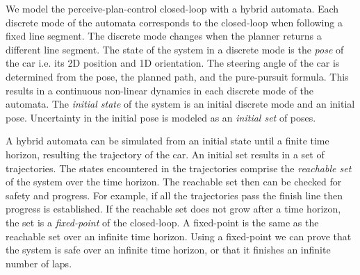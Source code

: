 We model the perceive-plan-control closed-loop with a hybrid automata.
%
Each discrete mode of the automata corresponds to the closed-loop when following a fixed line segment.
%
The discrete mode changes when the planner returns a different line segment.
%
The state of the system in a discrete mode is the \emph{pose} of the car i.e. its 2D position and 1D orientation.
%
The steering angle of the car is determined from the pose, the planned path, and the pure-pursuit formula.
%
This results in a continuous non-linear dynamics in each discrete mode of the automata.
%
The \emph{initial state} of the system is an initial discrete mode and an initial pose.
%
Uncertainty in the initial pose is modeled as an \emph{initial set} of poses.


A hybrid automata can be simulated from an initial state until a finite time horizon, resulting the trajectory of the car.
%
An initial set results in a set of trajectories.
%
The states encountered in the trajectories comprise the \emph{reachable set} of the system over the time horizon.
%
The reachable set then can be checked for safety and progress.
%
For example, if all the trajectories pass the finish line then progress is established.
%
If the reachable set does not grow after a time horizon, the set is a \emph{fixed-point} of the closed-loop.
%
A fixed-point is the same as the reachable set over an infinite time horizon.
%
Using a fixed-point we can prove that the system is safe over an infinite time horizon, or that it finishes an infinite number of laps.
